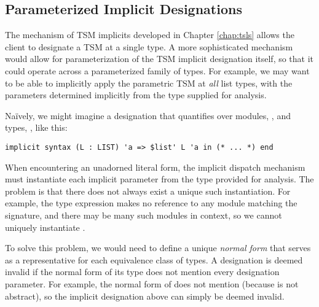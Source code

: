 

\subsection{Parameterized Implicit Designations}\label{sec:parametric-designations}
The mechanism of TSM implicits developed in Chapter \ref{chap:tsls} allows the client to designate a TSM at a single type. A more sophisticated mechanism would allow for parameterization of the TSM implicit designation itself, so that it could operate across a parameterized family of types. For example, we may want to be able to implicitly apply the parametric TSM  at \emph{all} list types, with the parameters determined implicitly from the type supplied for analysis.

Na\"ively, we might imagine a designation that quantifies over modules, , and types, , like this:
\begin{lstlisting}[numbers=none]
implicit syntax (L : LIST) 'a => $list' L 'a in (* ... *) end 
\end{lstlisting}
When encountering an unadorned literal form, the implicit dispatch mechanism must  instantiate each implicit parameter from the type provided for analysis. The problem is that there does not always exist a unique such instantiation. For example, the type expression  makes no reference to any module matching the  signature, and there may be many such modules in context, so we cannot uniquely instantiate .

To solve this problem, we would need to define a unique \emph{normal form} that serves as a representative for each equivalence class of types. A designation is deemed invalid if the normal form of its type does not mention every designation parameter. For example, the normal form of  does not mention  (because  is not abstract), so the implicit designation above can simply be deemed invalid.

